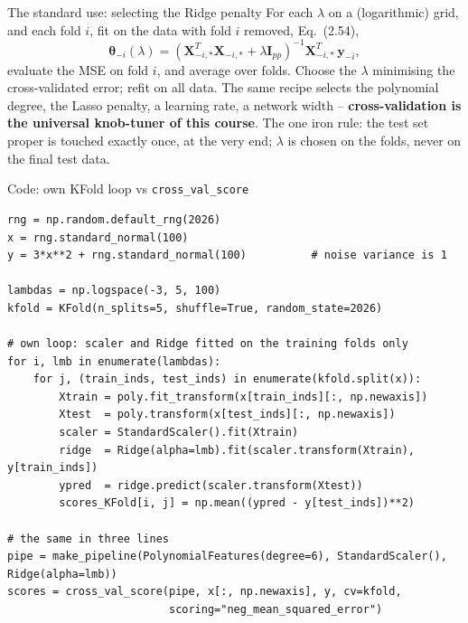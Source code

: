 \documentclass[10pt,aspectratio=169]{beamer}
\begin{document}
\begin{frame}{The standard use: selecting the Ridge penalty}
For each $\lambda$ on a (logarithmic) grid, and each fold $i$, fit on the data
with fold $i$ removed, Eq.~(2.54),
\[
  \bm{\theta}_{-i}(\lambda)
   = \left(\bm{X}_{-i,*}^T\bm{X}_{-i,*}+\lambda\bm{I}_{pp}\right)^{-1}
     \bm{X}_{-i,*}^T\,\bm{y}_{-i},
\]
evaluate the MSE on fold $i$, and average over folds.  Choose the $\lambda$
minimising the cross-validated error; refit on all data.
\vspace{4pt}
The same recipe selects the polynomial degree, the Lasso penalty, a learning
rate, a network width -- \textbf{cross-validation is the universal knob-tuner
of this course}.  The one iron rule: the test set proper is touched exactly
once, at the very end; $\lambda$ is chosen on the folds, never on the final
test data.
\end{frame}

\begin{frame}[fragile]{Code: own KFold loop vs \texttt{cross\_val\_score}}
\begin{lstlisting}
rng = np.random.default_rng(2026)
x = rng.standard_normal(100)
y = 3*x**2 + rng.standard_normal(100)          # noise variance is 1

lambdas = np.logspace(-3, 5, 100)
kfold = KFold(n_splits=5, shuffle=True, random_state=2026)

# own loop: scaler and Ridge fitted on the training folds only
for i, lmb in enumerate(lambdas):
    for j, (train_inds, test_inds) in enumerate(kfold.split(x)):
        Xtrain = poly.fit_transform(x[train_inds][:, np.newaxis])
        Xtest  = poly.transform(x[test_inds][:, np.newaxis])
        scaler = StandardScaler().fit(Xtrain)
        ridge  = Ridge(alpha=lmb).fit(scaler.transform(Xtrain), y[train_inds])
        ypred  = ridge.predict(scaler.transform(Xtest))
        scores_KFold[i, j] = np.mean((ypred - y[test_inds])**2)

# the same in three lines
pipe = make_pipeline(PolynomialFeatures(degree=6), StandardScaler(), Ridge(alpha=lmb))
scores = cross_val_score(pipe, x[:, np.newaxis], y, cv=kfold,
                         scoring="neg_mean_squared_error")
\end{lstlisting}
\end{frame}
\end{document}
